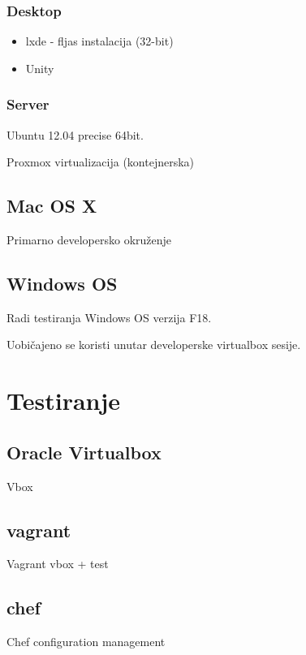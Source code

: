 \documentclass[times, utf8, seminar]{fit}
\begin{document}
\subsection{Desktop}

\begin{itemize}
  \item lxde - fljas instalacija (32-bit)
  \item Unity
\end{itemize}

\subsection{Server}

Ubuntu 12.04 precise 64bit.

Proxmox virtualizacija (kontejnerska)

\section{Mac OS X}

Primarno developersko okruženje

\section{Windows OS}

Radi testiranja Windows OS verzija F18.

Uobičajeno se koristi unutar developerske virtualbox sesije.

\chapter{Testiranje}

\section{Oracle Virtualbox}

Vbox

\section{vagrant}

Vagrant vbox + test

\section{chef}

Chef configuration management
\end{document}
